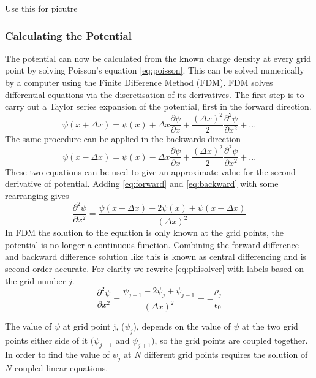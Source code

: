 \documentclass[12pt]{article}
\def\be{\begin{equation}}
\def\ee{\end{equation}}
\begin{document}
Use this for picutre %
\subsubsection{Calculating the Potential}
The potential can now be calculated from the known charge density at every grid point by solving Poisson's equation \eqref{eq:poisson}. This can be solved numerically by a computer using the Finite Difference Method (FDM). FDM solves differential equations via the discretisation of its derivatives. The first step is to carry out a Taylor series expansion of the potential, first in the forward direction.
\be
\psi(x+\Delta x) = \psi(x) + \Delta x \frac{\partial \psi}{\partial x} + \frac{{(\Delta x)}^2}{2}\frac{{\partial}^2\psi}{\partial x^2} + ...
\label{eq:forward}
\ee
The same procedure can be applied in the backwards direction 
\be
\psi(x-\Delta x) = \psi(x) - \Delta x \frac{\partial \psi}{\partial x} + \frac{{(\Delta x)}^2}{2}\frac{{\partial}^2\psi}{\partial x^2} + ...
\label{eq:backward}
\ee
These two equations can be used to give an approximate value for the second derivative of potential. Adding \eqref{eq:forward} and \eqref{eq:backward} with some rearranging gives 
\be 
\frac{{\partial}^2\psi}{\partial x^2} = \frac{\psi(x+\Delta x) -2\psi(x) + \psi(x-\Delta x)}{{(\Delta x)}^2}
\label{eq:phisolver}
\ee 
In FDM the solution to the equation is only known at the grid points, the potential is no longer a continuous function. Combining the forward difference and backward difference solution like this is known as central differencing and is second order accurate. For clarity we rewrite \eqref{eq:phisolver} with labels based on the grid number $j$. 
\be 
\frac{{\partial}^2\psi}{\partial x^2} = \frac{\psi_{j+1} -2\psi_{j} + \psi_{j-1}}{{(\Delta x)}^2} = -\frac{\rho_j}{\epsilon_0}
\label{eq:phisolver1}
\ee 

The value of $\psi$ at grid point j, ($\psi_j$),  depends on the value of $\psi$ at the two grid points either side of it $(\psi_{j-1}$ and $\psi_{j+1})$, so the grid points are coupled together. In order to find the value of $\psi_j$ at $N$ different grid points requires the solution of $N$ coupled linear equations. 
\end{document}
